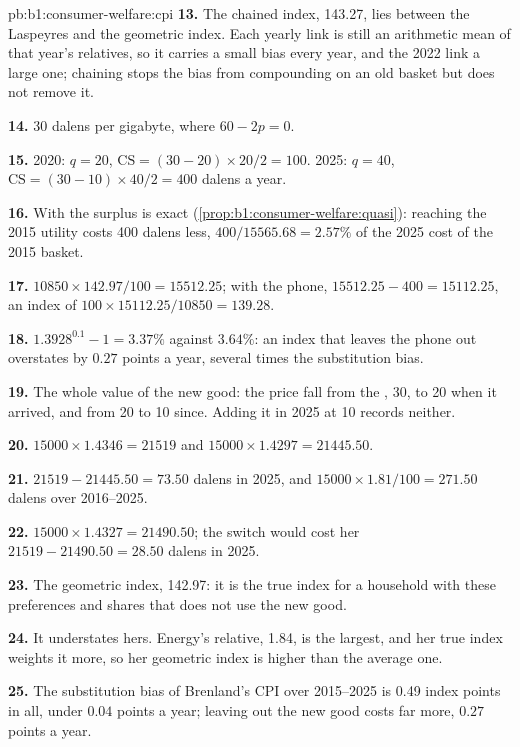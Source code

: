 \begin{solution}{pb:b1:consumer-welfare:cpi}
\textbf{13.} The chained index, 143.27, lies between the Laspeyres and the
geometric index. Each yearly link is still an arithmetic mean of that year's
relatives, so it carries a small bias every year, and the 2022 link a large
one; chaining stops the bias from compounding on an old basket but does not
remove it.

\textbf{14.} 30 dalens per gigabyte, where $60 - 2p = 0$.

\textbf{15.} 2020: $q = 20$, $\mathrm{CS} = (30 - 20) \times 20/2 = 100$. 2025: $q = 40$,
$\mathrm{CS} = (30 - 10) \times 40/2 = 400$ dalens a year.

\textbf{16.} With  the surplus is exact
(\cref{prop:b1:consumer-welfare:quasi}): reaching the 2015 utility costs 400
dalens less, $400/15565.68 = 2.57\%$ of the 2025 cost of the 2015 basket.

\textbf{17.} $10850 \times 142.97/100 = 15512.25$; with the phone,
$15512.25 - 400 = 15112.25$, an index of $100 \times 15112.25/10850 = 139.28$.

\textbf{18.} $1.3928^{0.1} - 1 = 3.37\%$ against $3.64\%$: an index that leaves the
phone out overstates by $0.27$ points a year, several times the substitution
bias.

\textbf{19.} The whole value of the new good: the price fall from the , 30, to 20 when it arrived, and from 20 to 10 since. Adding it in 2025
at 10 records neither.

\textbf{20.} $15000 \times 1.4346 = 21519$ and $15000 \times 1.4297 = 21445.50$.

\textbf{21.} $21519 - 21445.50 = 73.50$ dalens in 2025, and
$15000 \times 1.81/100 = 271.50$ dalens over 2016--2025.

\textbf{22.} $15000 \times 1.4327 = 21490.50$; the switch would cost her
$21519 - 21490.50 = 28.50$ dalens in 2025.

\textbf{23.} The geometric index, 142.97: it is the true index for a household
with these preferences and shares that does not use the new good.

\textbf{24.} It understates hers. Energy's relative, 1.84, is the largest, and her
true index weights it more, so her geometric index is higher than the
average one.

\textbf{25.} The substitution bias of Brenland's CPI over 2015--2025 is 0.49
index points in all, under $0.04$ points a year; leaving out the new good
costs far more, $0.27$ points a year.
\end{solution}
